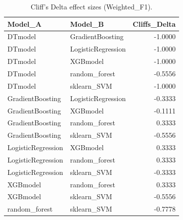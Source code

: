 \begin{table}[t]
\centering
\begin{tabular}{llr}
\toprule
Model_A & Model_B & Cliffs_Delta \\
\midrule
DTmodel & GradientBoosting & -1.0000 \\
DTmodel & LogisticRegression & -1.0000 \\
DTmodel & XGBmodel & -1.0000 \\
DTmodel & random_forest & -0.5556 \\
DTmodel & sklearn_SVM & -1.0000 \\
GradientBoosting & LogisticRegression & -0.3333 \\
GradientBoosting & XGBmodel & -0.1111 \\
GradientBoosting & random_forest & 0.3333 \\
GradientBoosting & sklearn_SVM & -0.5556 \\
LogisticRegression & XGBmodel & 0.3333 \\
LogisticRegression & random_forest & 0.3333 \\
LogisticRegression & sklearn_SVM & -0.3333 \\
XGBmodel & random_forest & 0.3333 \\
XGBmodel & sklearn_SVM & -0.5556 \\
random_forest & sklearn_SVM & -0.7778 \\
\bottomrule
\end{tabular}
\caption{Cliff's Delta effect sizes (Weighted_F1).}
\label{tab:cliffs_Weighted_F1}
\end{table}